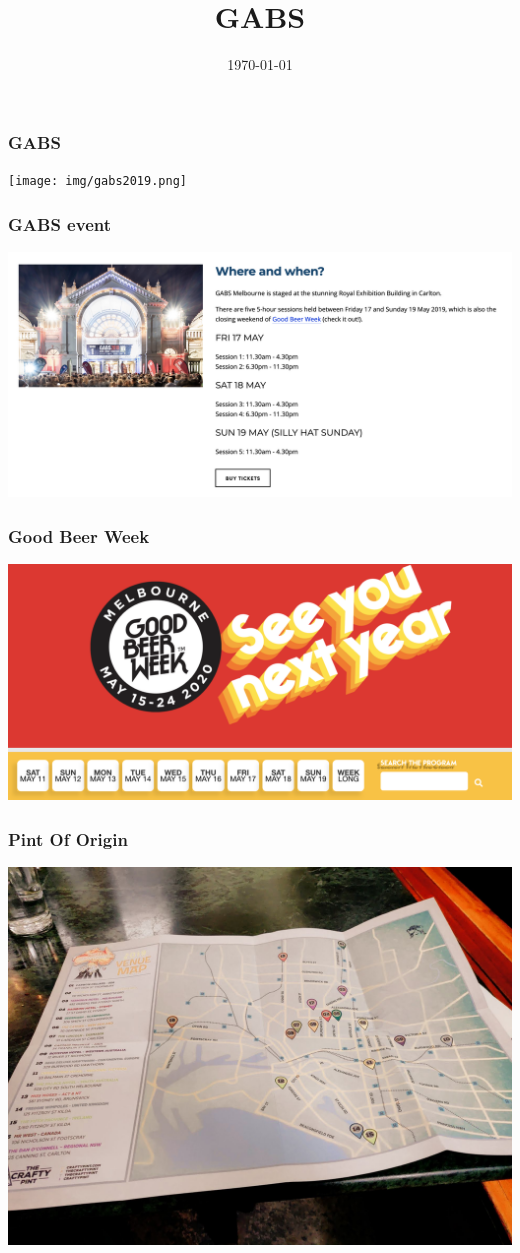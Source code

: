 \documentclass[12pt]{beamer}
\title{GABS}
\date{\today}
\newcommand{\nologo}{\setbeamertemplate{logo}{}} %
\begin{document}
    {\nologo
    \begin{frame}
        \frametitle{GABS}
        \texttt{[image: img/gabs2019.png]}
    \end{frame}
    }

    \begin{frame}
        \frametitle{GABS event}
        \includegraphics[height=0.80\textheight,width=1\textwidth]{img/gabs2019-event-info.png}
    \end{frame}

    \begin{frame}
        \frametitle{Good Beer Week}
        \includegraphics[height=0.80\textheight,width=1\textwidth]{img/good-beer-week.png}
    \end{frame}

    \begin{frame}
        \frametitle{Pint Of Origin}
        \includegraphics[height=0.80\textheight,width=1\textwidth]{img/pint-of-origin.jpg}
    \end{frame}
\end{document}
